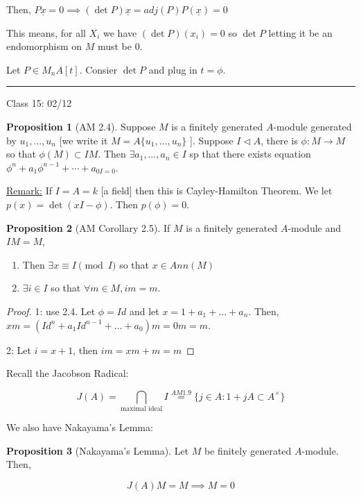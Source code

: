 \documentclass{article}
\theoremstyle{definition}
\newtheorem{proposition}{Proposition}
\begin{document}
Then, \(P \underline{x} = 0 \implies (\det P)\underline{x} = adj(P)P(\underline{x}) = 0\) 

This means, for all \(X_i\) we have \((\det P)(x_i)=0\) so \(\det P\) letting it be an endomorphism on \(M\) must be \(0\).

Let \(P \in M_n A[t]\). Consier \(\det P\) and plug in \(t = \phi\).

\hfil
\hrule

Class 15: 02/12

\begin{proposition}
    [AM 2.4] Suppose \(M\) is a finitely generated \(A\)-module generated by \(u_1, \dots, u_n \) [we write it \(M = A \{ u_1, \dots, u_n  \} \) ]. Suppose \(I \triangleleft A\), there is \(\phi:M\to M\) so that \(\phi(M) \subset IM\). Then \(\exists a_1, \dots, a_n \in I\) sp that there exists equation \(\phi^n + a_1\phi^{n-1}+\cdots + a_{0I = 0}\).
\end{proposition}

\underline{Remark:} If \(I = A = k\) [a field] then this is Cayley-Hamilton Theorem. We let \(p(x)=\det(xI-\phi)\). Then \(p(\phi)=0\).

\begin{proposition}
    [AM Corollary 2.5] If \(M\) is a finitely generated \(A\)-module and \(IM = M\),

    \begin{enumerate}
        \item Then \(\exists x\equiv I \pmod I\) so that \(x\in Ann(M)\) 
        \item \(\exists i\in I\) so that \(\forall m\in M, im=m\).
    \end{enumerate}
\end{proposition}

\begin{proof}
    1: use 2.4. Let \(\phi = Id\) and let \(x = 1 + a_1 + \dots + a_n\). Then, \(xm = (Id^n + a_1 Id^{n-1}+ \dots + a_0)m = 0m = m\).

    2: Let \(i = x + 1\), then \(im = xm + m = m\)
\end{proof}

Recall the Jacobson Radical:

\[
    J(A) = \bigcap_{\text{maximal ideal}} I \overset{AM 1.9}{=} \{ j \in A : 1+jA \subset A^\times \} 
\]

We also have Nakayama's Lemma:

\begin{proposition}
    [Nakayama's Lemma]

    Let \(M\) be finitely generated \(A\)-module. Then,

    \[
        J(A)M = M \implies M = 0
    \]
\end{proposition}
\end{document}
